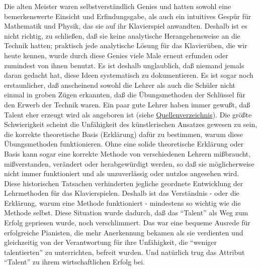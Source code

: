 Die alten Meister waren selbstverständlich Genies und hatten sowohl eine bemerkenswerte Einsicht und Erfindungsgabe, als auch ein intuitives Gespür für Mathematik und Physik, das sie auf ihr Klavierspiel anwandten.
Deshalb ist es nicht richtig, zu schließen, daß sie keine analytische Herangehensweise an die Technik hatten; praktisch jede analytische Lösung für das Klavierüben, die wir heute kennen, wurde durch diese Genies viele Male erneut erfunden oder zumindest von ihnen benutzt.
Es ist deshalb unglaublich, daß niemand jemals daran gedacht hat, diese Ideen systematisch zu dokumentieren.
Es ist sogar noch erstaunlicher, daß anscheinend sowohl die Lehrer als auch die Schüler nicht einmal in groben Zügen erkannten, daß die Übungsmethoden der Schlüssel für den Erwerb der Technik waren.
Ein paar gute Lehrer haben immer gewußt, daß Talent eher erzeugt wird als angeboren ist (siehe \hyperref[reference]{Quellenverzeichnis}).
Die größte Schwierigkeit scheint die Unfähigkeit des künstlerischen Ansatzes gewesen zu sein, die korrekte theoretische Basis (Erklärung) dafür zu bestimmen, warum diese Übungsmethoden funktionieren.
Ohne eine solide theoretische Erklärung oder Basis kann sogar eine korrekte Methode von verschiedenen Lehrern mißbraucht, mißverstanden, verändert oder herabgewürdigt werden, so daß sie möglicherweise nicht immer funktioniert und als unzuverlässig oder nutzlos angesehen wird.
Diese historischen Tatsachen verhinderten jegliche geordnete Entwicklung der Lehrmethoden für das Klavierspielen.
Deshalb ist das Verständnis - oder die Erklärung, warum eine Methode funktioniert - mindestens so wichtig wie die Methode selbst.
Diese Situation wurde dadurch, daß das \enquote{Talent} als Weg zum Erfolg gepriesen wurde, noch verschlimmert.
Das war eine bequeme Ausrede für erfolgreiche Pianisten, die mehr Anerkennung bekamen als sie verdienten und gleichzeitig von der Verantwortung für ihre Unfähigkeit, die \enquote{weniger talentierten} zu unterrichten, befreit wurden.
Und natürlich trug das Attribut \enquote{Talent} zu ihrem wirtschaftlichen Erfolg bei.

